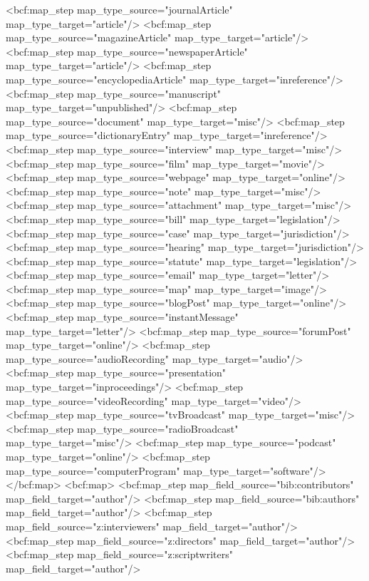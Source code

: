         <bcf:map_step map_type_source="journalArticle" map_type_target="article"/>
        <bcf:map_step map_type_source="magazineArticle" map_type_target="article"/>
        <bcf:map_step map_type_source="newspaperArticle" map_type_target="article"/>
        <bcf:map_step map_type_source="encyclopediaArticle" map_type_target="inreference"/>
        <bcf:map_step map_type_source="manuscript" map_type_target="unpublished"/>
        <bcf:map_step map_type_source="document" map_type_target="misc"/>
        <bcf:map_step map_type_source="dictionaryEntry" map_type_target="inreference"/>
        <bcf:map_step map_type_source="interview" map_type_target="misc"/>
        <bcf:map_step map_type_source="film" map_type_target="movie"/>
        <bcf:map_step map_type_source="webpage" map_type_target="online"/>
        <bcf:map_step map_type_source="note" map_type_target="misc"/>
        <bcf:map_step map_type_source="attachment" map_type_target="misc"/>
        <bcf:map_step map_type_source="bill" map_type_target="legislation"/>
        <bcf:map_step map_type_source="case" map_type_target="jurisdiction"/>
        <bcf:map_step map_type_source="hearing" map_type_target="jurisdiction"/>
        <bcf:map_step map_type_source="statute" map_type_target="legislation"/>
        <bcf:map_step map_type_source="email" map_type_target="letter"/>
        <bcf:map_step map_type_source="map" map_type_target="image"/>
        <bcf:map_step map_type_source="blogPost" map_type_target="online"/>
        <bcf:map_step map_type_source="instantMessage" map_type_target="letter"/>
        <bcf:map_step map_type_source="forumPost" map_type_target="online"/>
        <bcf:map_step map_type_source="audioRecording" map_type_target="audio"/>
        <bcf:map_step map_type_source="presentation" map_type_target="inproceedings"/>
        <bcf:map_step map_type_source="videoRecording" map_type_target="video"/>
        <bcf:map_step map_type_source="tvBroadcast" map_type_target="misc"/>
        <bcf:map_step map_type_source="radioBroadcast" map_type_target="misc"/>
        <bcf:map_step map_type_source="podcast" map_type_target="online"/>
        <bcf:map_step map_type_source="computerProgram" map_type_target="software"/>
      </bcf:map>
      <bcf:map>
        <bcf:map_step map_field_source="bib:contributors" map_field_target="author"/>
        <bcf:map_step map_field_source="bib:authors" map_field_target="author"/>
        <bcf:map_step map_field_source="z:interviewers" map_field_target="author"/>
        <bcf:map_step map_field_source="z:directors" map_field_target="author"/>
        <bcf:map_step map_field_source="z:scriptwriters" map_field_target="author"/>
